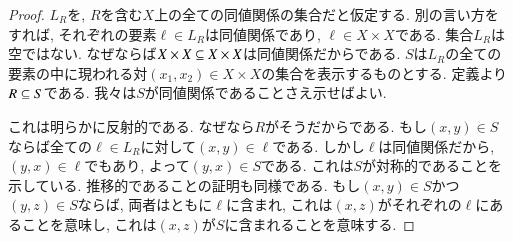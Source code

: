 \begin{proof}


$L_R$を, $R$を含む$X$上の全ての同値関係の集合だと仮定する. 別の言い方をすれば, それぞれの要素$\ell\in L_R$は同値関係であり, $\ell\in X\times X$である. 集合$L_R$は空ではない. なぜならば$X\times X\ss X\times X$は同値関係だからである. $S$は$L_R$の全ての要素の中に現われる対$(x_1,x_2)\in X\times X$の集合を表示するものとする. 定義より$R\ss S$である. 我々は$S$が同値関係であることさえ示せばよい.


これは明らかに反射的である. なぜなら$R$がそうだからである. もし$(x,y)\in S$ならば全ての$\ell\in L_R$に対して$(x,y)\in\ell$である. しかし$\ell$は同値関係だから, $(y,x)\in\ell$でもあり, よって$(y,x)\in S$である. これは$S$が対称的であることを示している. 推移的であることの証明も同様である. もし$(x,y)\in S$かつ$(y,z)\in S$ならば, 両者はともに$\ell$に含まれ, これは$(x,z)$がそれぞれの$\ell$にあることを意味し, これは$(x,z)$が$S$に含まれることを意味する.

\end{proof}

